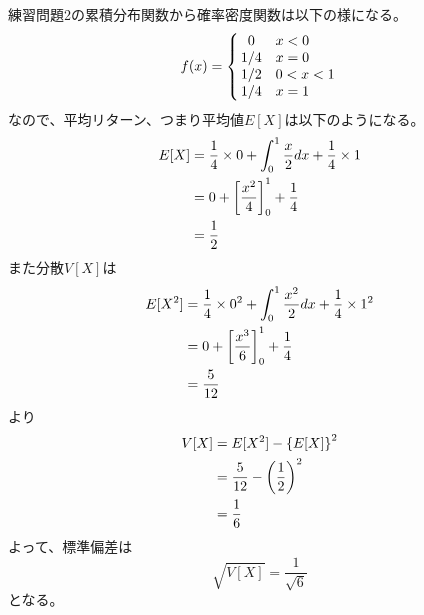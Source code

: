 \documentclass{jsarticle}
\begin{document}
    \subsection{}
    練習問題2の累積分布関数から確率密度関数は以下の様になる。
    \begin{equation}
      f(x) = \left\{
                \begin{array}{@{\,}cl@{\,}}
                  0 & x<0 \\
                  1/4 & x = 0 \\
                  1/2 & 0<x<1 \\
                  1/4 & x = 1
                \end{array}
            \right.
    \end{equation}
    なので、平均リターン、つまり平均値$E[X]$は以下のようになる。
    \begin{align}
      E[X] &= \frac{1}{4}\times0 + \int_0^1 \frac{x}{2}dx + \frac{1}{4}\times1 \notag \\
      &= 0+ \left[\frac{x^2}{4}\right]_0^1 + \frac{1}{4} \notag \\
      &= \frac{1}{2}
    \end{align}
    また分散$V[X]$は
    \begin{align}
      E[X^2] &= \frac{1}{4}\times0^2 + \int_0^1 \frac{x^2}{2}dx + \frac{1}{4}\times1^2 \notag \\
      &= 0+ \left[\frac{x^3}{6}\right]_0^1 + \frac{1}{4} \notag \\
      &= \frac{5}{12}
    \end{align}
    より
    \begin{align}
      V[X] &= E[X^2] - \left\{E[X]\right\}^2 \notag \\
      &= \frac{5}{12} - \left(\frac{1}{2}\right)^2 \notag \\
      &= \frac{1}{6}
    \end{align}
    よって、標準偏差は
    \begin{equation}
      \sqrt{V[X]} = \frac{1}{\sqrt{6}}
    \end{equation}
    となる。
\end{document}
